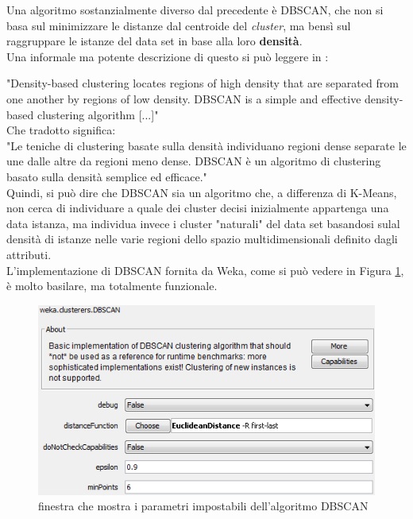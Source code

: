         Una algoritmo sostanzialmente diverso dal precedente è DBSCAN, che non si basa sul minimizzare le distanze dal centroide del \textit{cluster}, ma bensì sul raggruppare le istanze del data set in base alla loro \textbf{densità}. \\

        Una informale ma potente descrizione di questo si può leggere in \cite{dispense}:

        "Density-based clustering locates regions of high density that are separated from one another by regions of low density. DBSCAN is a simple and effective density-based clustering algorithm [...]"\\

        Che tradotto significa:\\

        "Le teniche di clustering basate sulla densità individuano regioni dense separate le une dalle altre da regioni meno dense. DBSCAN è un algoritmo di clustering basato sulla densità semplice ed efficace."\\

        Quindi, si può dire che DBSCAN sia un algoritmo che, a differenza di K-Means, non cerca di individuare a quale dei cluster decisi inizialmente appartenga una data istanza, ma individua invece i cluster "naturali" del data set basandosi sulal densità di istanze nelle varie regioni dello spazio multidimensionali definito dagli attributi. \\

        L'implementazione di DBSCAN fornita da Weka, come si può vedere in Figura \ref{dbscan_weka}, è molto basilare, ma totalmente funzionale.

        \begin{figure}
            \centering
            \caption{finestra che mostra i parametri impostabili dell'algoritmo DBSCAN}
            \label{dbscan_weka}
            \includegraphics[scale=0.70]{img/dbscan_weka.png}
        \end{figure}

